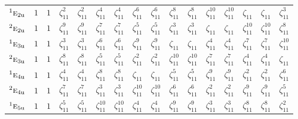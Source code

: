 \documentclass[10pt,a4paper]{article}
\numberwithin{equation}{section}
\newcommand{\irr}[1]{\text{\normalfont\scshape #1}}
\newcommand{\conjpair}[1]{{}^{#1}}
\newcommand{\ptag}[1]{\mathrm{#1}}
\newcommand{\rootunity}[1]{\zeta_{#1}}
\begin{document}
{\begin{longtable}{@{}lccccccccccccccc@{}}
$\conjpair{1}\irr{e}_{2\ptag{u}}$ & $1$ & $1$ & $\rootunity{11}^{2}$ & $\rootunity{11}^{2}$ & $\rootunity{11}^{4}$ & $\rootunity{11}^{4}$ & $\rootunity{11}^{6}$ & $\rootunity{11}^{6}$ & $\rootunity{11}^{8}$ & $\rootunity{11}^{8}$ & $\rootunity{11}^{10}$ & $\rootunity{11}^{10}$ & $\rootunity{11}$ & $\rootunity{11}$ & $\rootunity{11}^{3}$\\
$\conjpair{2}\irr{e}_{2\ptag{u}}$ & $1$ & $1$ & $\rootunity{11}^{9}$ & $\rootunity{11}^{9}$ & $\rootunity{11}^{7}$ & $\rootunity{11}^{7}$ & $\rootunity{11}^{5}$ & $\rootunity{11}^{5}$ & $\rootunity{11}^{3}$ & $\rootunity{11}^{3}$ & $\rootunity{11}$ & $\rootunity{11}$ & $\rootunity{11}^{10}$ & $\rootunity{11}^{10}$ & $\rootunity{11}^{8}$\\
$\conjpair{1}\irr{e}_{3\ptag{u}}$ & $1$ & $1$ & $\rootunity{11}^{3}$ & $\rootunity{11}^{3}$ & $\rootunity{11}^{6}$ & $\rootunity{11}^{6}$ & $\rootunity{11}^{9}$ & $\rootunity{11}^{9}$ & $\rootunity{11}$ & $\rootunity{11}$ & $\rootunity{11}^{4}$ & $\rootunity{11}^{4}$ & $\rootunity{11}^{7}$ & $\rootunity{11}^{7}$ & $\rootunity{11}^{10}$\\
$\conjpair{2}\irr{e}_{3\ptag{u}}$ & $1$ & $1$ & $\rootunity{11}^{8}$ & $\rootunity{11}^{8}$ & $\rootunity{11}^{5}$ & $\rootunity{11}^{5}$ & $\rootunity{11}^{2}$ & $\rootunity{11}^{2}$ & $\rootunity{11}^{10}$ & $\rootunity{11}^{10}$ & $\rootunity{11}^{7}$ & $\rootunity{11}^{7}$ & $\rootunity{11}^{4}$ & $\rootunity{11}^{4}$ & $\rootunity{11}$\\
$\conjpair{1}\irr{e}_{4\ptag{u}}$ & $1$ & $1$ & $\rootunity{11}^{4}$ & $\rootunity{11}^{4}$ & $\rootunity{11}^{8}$ & $\rootunity{11}^{8}$ & $\rootunity{11}$ & $\rootunity{11}$ & $\rootunity{11}^{5}$ & $\rootunity{11}^{5}$ & $\rootunity{11}^{9}$ & $\rootunity{11}^{9}$ & $\rootunity{11}^{2}$ & $\rootunity{11}^{2}$ & $\rootunity{11}^{6}$\\
$\conjpair{2}\irr{e}_{4\ptag{u}}$ & $1$ & $1$ & $\rootunity{11}^{7}$ & $\rootunity{11}^{7}$ & $\rootunity{11}^{3}$ & $\rootunity{11}^{3}$ & $\rootunity{11}^{10}$ & $\rootunity{11}^{10}$ & $\rootunity{11}^{6}$ & $\rootunity{11}^{6}$ & $\rootunity{11}^{2}$ & $\rootunity{11}^{2}$ & $\rootunity{11}^{9}$ & $\rootunity{11}^{9}$ & $\rootunity{11}^{5}$\\
$\conjpair{1}\irr{e}_{5\ptag{u}}$ & $1$ & $1$ & $\rootunity{11}^{5}$ & $\rootunity{11}^{5}$ & $\rootunity{11}^{10}$ & $\rootunity{11}^{10}$ & $\rootunity{11}^{4}$ & $\rootunity{11}^{4}$ & $\rootunity{11}^{9}$ & $\rootunity{11}^{9}$ & $\rootunity{11}^{3}$ & $\rootunity{11}^{3}$ & $\rootunity{11}^{8}$ & $\rootunity{11}^{8}$ & $\rootunity{11}^{2}$\\

\end{longtable}}
\end{document}
